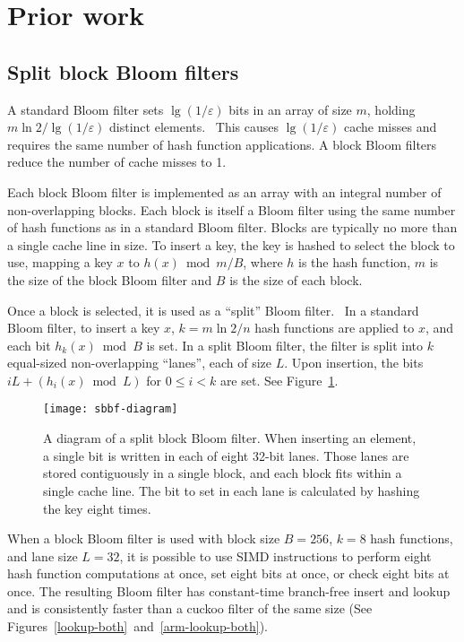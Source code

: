 \documentclass[sigconf, nonacm]{acmart}
\begin{document}

\section{Prior work}

\subsection{Split block Bloom filters}

A standard Bloom filter sets $\lg (1/\varepsilon)$ bits in an array of size $m$, holding $m \ln 2 / \lg(1/\varepsilon)$ distinct elements.~\cite{bloom-original}
This causes $\lg (1/\varepsilon)$ cache misses and requires the same number of hash function applications.
A block Bloom filters reduce the number of cache misses to 1.~\cite{block-bloom}

Each block Bloom filter is implemented as an array with an integral number of non-overlapping blocks.
Each block is itself a Bloom filter using the same number of hash functions as in a standard Bloom filter.
Blocks are typically no more than a single cache line in size.
To insert a key, the key is hashed to select the block to use, mapping a key $x$ to $h(x) \bmod m/B$, where $h$ is the hash function, $m$ is the size of the block Bloom filter and $B$ is the size of each block.

Once a block is selected, it is used as a ``split'' Bloom filter.~\cite{split-bloom}
In a standard Bloom filter, to insert a key $x$, $k = m \ln 2 / n$ hash functions are applied to $x$, and each bit $h_k(x) \bmod B$ is set.
In a split Bloom filter, the filter is split into $k$ equal-sized non-overlapping ``lanes'', each of size $L$.
Upon insertion, the bits $i L + (h_i(x) \bmod L)$ for $0 \le i < k$ are set.
See Figure~\ref{sbbf-diagram}.

\begin{figure}
  \texttt{[image: sbbf-diagram]}
\caption{\label{sbbf-diagram}
A diagram of a split block Bloom filter.
When inserting an element, a single bit is written in each of eight 32-bit lanes.
Those lanes are stored contiguously in a single block, and each block fits within a single cache line.
The bit to set in each lane is calculated by hashing the key eight times.
}
\end{figure}

When a block Bloom filter is used with block size $B = 256$, $k = 8$ hash functions, and lane size $L = 32$, it is possible to use SIMD instructions to perform eight hash function computations at once, set eight bits at once, or check eight bits at once.
The resulting Bloom filter has constant-time branch-free insert and lookup and is consistently faster than a cuckoo filter of the same size (See Figures~\ref{lookup-both}~and~\ref{arm-lookup-both}).~\cite{cuckoo-filter-github,ultra-fast,overtakes,impala-bloom}
\end{document}

